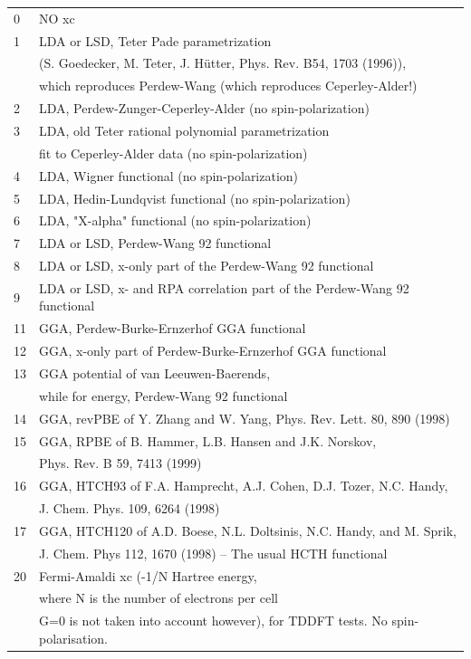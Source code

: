 \documentclass[a4paper,11pt]{report}
\begin{document}
\begin{longtable}{ll}
0  & NO xc\\
1  & LDA or LSD, Teter Pade parametrization\\
   & (S. Goedecker, M. Teter, J. H\"utter, Phys. Rev. B54, 1703 (1996)),\\
   & which reproduces Perdew-Wang (which reproduces Ceperley-Alder!)\\
2  & LDA, Perdew-Zunger-Ceperley-Alder (no spin-polarization)\\
3  & LDA, old Teter rational polynomial parametrization\\
   & fit to Ceperley-Alder data (no spin-polarization)\\
4  & LDA, Wigner functional (no spin-polarization)\\
5  & LDA, Hedin-Lundqvist functional (no spin-polarization)\\
6  & LDA, "X-alpha" functional (no spin-polarization)\\
7  & LDA or LSD, Perdew-Wang 92 functional\\
8  & LDA or LSD, x-only part of the Perdew-Wang 92 functional\\
9  & LDA or LSD, x- and RPA correlation part of the Perdew-Wang 92 functional\\
11 & GGA, Perdew-Burke-Ernzerhof GGA functional\\
12 & GGA, x-only part of Perdew-Burke-Ernzerhof GGA functional\\
13 & GGA potential of van Leeuwen-Baerends,\\
   & while for energy, Perdew-Wang 92 functional\\
14 & GGA, revPBE of Y. Zhang and W. Yang, Phys. Rev. Lett. 80, 890 (1998)\\
15 & GGA, RPBE of B. Hammer, L.B. Hansen and J.K. Norskov,\\
   & Phys. Rev. B 59, 7413 (1999)\\
16 & GGA, HTCH93 of F.A. Hamprecht, A.J. Cohen, D.J. Tozer, N.C. Handy,\\
   & J. Chem. Phys. 109, 6264 (1998)\\
17 & GGA, HTCH120 of A.D. Boese, N.L. Doltsinis, N.C. Handy, and M. Sprik,\\
   & J. Chem. Phys 112, 1670 (1998) -- The usual HCTH functional\\
20 & Fermi-Amaldi xc (-1/N Hartree energy, \\
   & where N is the number of electrons per cell\\
   & G=0 is not taken into account however), for TDDFT tests. No spin-polarisation.\\

\end{longtable}
\end{document}
